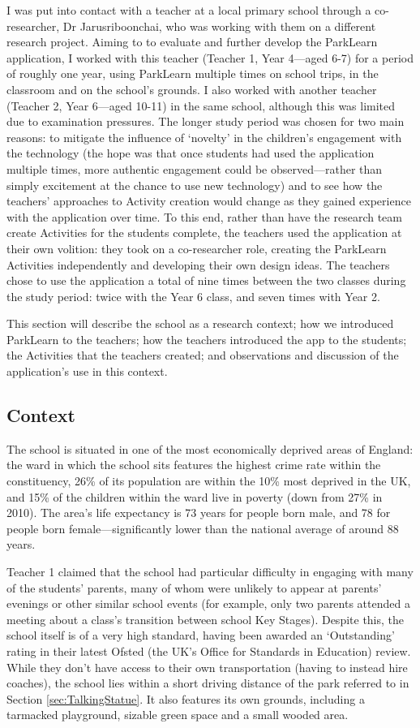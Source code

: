 I was put into contact with a teacher at a local primary school through a co-researcher, Dr Jarusriboonchai, who was working with them on a different research project. Aiming to to evaluate and further develop the ParkLearn application, I worked with this teacher (Teacher 1, Year 4---aged 6-7) for a period of roughly one year, using ParkLearn multiple times on school trips, in the classroom and on the school's grounds. I also worked with another teacher (Teacher 2, Year 6---aged 10-11) in the same school, although this was limited due to examination pressures. The longer study period was chosen for two main reasons: to mitigate the influence of `novelty' in the children’s engagement with the technology (the hope was that once students had used the application multiple times, more authentic engagement could be observed---rather than simply excitement at the chance to use new technology) \citep{Sharples2013} and to see how the teachers' approaches to Activity creation would change as they gained experience with the application over time. To this end, rather than have the research team create Activities for the students complete, the teachers used the application at their own volition: they took on a co-researcher role, creating the ParkLearn Activities independently and developing their own design ideas. The teachers chose to use the application a total of nine times between the two classes during the study period: twice with the Year 6 class, and seven times with Year 2.

This section will describe the school as a research context; how we introduced ParkLearn to the teachers; how the teachers introduced the app to the students; the Activities that the teachers created; and observations and discussion of the application's use in this context.

\subsection{Context}
The school is situated in one of the most economically deprived areas of England: the ward in which the school sits features the highest crime rate within the constituency, 26\% of its population are within the 10\% most deprived in the UK, and 15\% of the children within the ward live in poverty (down from 27\% in 2010). The area's life expectancy is 73 years for people born male, and 78 for people born female---significantly lower than the national average of around 88 years.

Teacher 1 claimed that the school had particular difficulty in engaging with many of the students' parents, many of whom were unlikely to appear at parents' evenings or other similar school events (for example, only two parents attended a meeting about a class's transition between school Key Stages). Despite this, the school itself is of a very high standard, having been awarded an `Outstanding' rating in their latest Ofsted (the UK’s Office for Standards in Education) review. While they don't have access to their own transportation (having to instead hire coaches), the school lies within a short driving distance of the park referred to in Section \ref{sec:TalkingStatue}. It also features its own grounds, including a tarmacked playground, sizable green space and a small wooded area.

